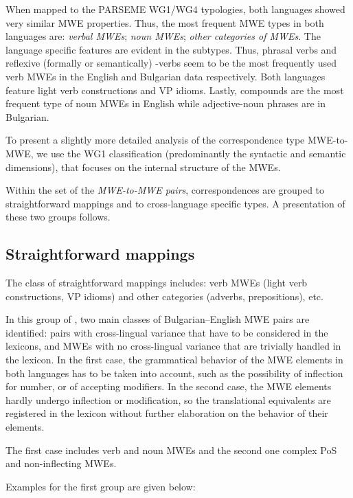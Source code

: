 \documentclass[output=paper]{langsci/langscibook}
\begin{document}
When mapped to the PARSEME WG1/WG4 typologies, both languages showed very similar MWE properties. Thus, the most frequent MWE types in both languages
are: {\em verbal MWEs}; {\em noun MWEs}; {\em other categories of MWEs}.
The language specific features are evident in the subtypes. Thus, 
phrasal verbs and reflexive (formally or semantically) \textit{}-verbs seem to
be the most frequently used verb MWEs in the English and Bulgarian data
respectively. Both languages feature light verb constructions and VP idioms.
Lastly, compounds are the most frequent type of noun MWEs in English while adjective-noun phrases are in Bulgarian. 

To present a slightly more detailed analysis of the correspondence type
MWE-to-MWE, we use the WG1 classification (predominantly the syntactic and
semantic dimensions), that focuses on the internal structure of the MWEs.


Within the set of the {\em MWE-to-MWE pairs}, correspondences are grouped to straightforward mappings and to cross-language specific types. A presentation of these two groups follows. 

\subsection{ Straightforward mappings}

The class of straightforward mappings includes: verb MWEs (light verb constructions, VP idioms) and other
categories (adverbs, prepositions), etc.


In this group of , two main classes of Bul\-garian--Eng\-lish MWE pairs are identified:  pairs with cross-lingual
variance that have to be considered in the lexicons, and MWEs with
no cross-lingual variance that are trivially handled in the lexicon. In the first case, the grammatical behavior of the MWE elements in both languages has to
be taken into account, such as the possibility of inflection for number, or of accepting modifiers. In the second case, the MWE elements hardly undergo inflection 
or modification, so the translational equivalents are registered in the lexicon without further elaboration on the behavior of their elements.
 
The first case includes verb and noun MWEs and the second one complex PoS and
non-inflecting MWEs. 

Examples for the first group are given below:
\end{document}
